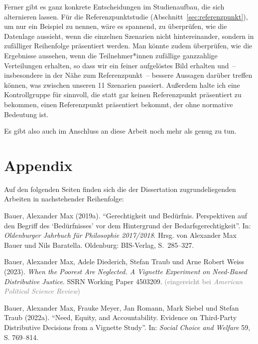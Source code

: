 \documentclass[justified,nobib,symmetric,twoside]{tufte-handout}
\begin{document}
Ferner gibt es ganz konkrete Entscheidungen im Studienaufbau, die sich alternieren lassen.
Für die Referenzpunktstudie (Abschnitt~\ref{sec:referenzpunkt}), um nur ein Beispiel zu nennen, wäre es spannend, zu überprüfen, wie die Datenlage aussieht, wenn die einzelnen Szenarien nicht hintereinander, sondern in zufälliger Reihenfolge präsentiert werden.
Man könnte zudem überprüfen, wie die Ergebnisse aussehen, wenn die Teilnehmer*innen zufällige ganzzahlige Verteilungen erhalten, so dass wir ein feiner aufgelöstes Bild erhalten und~-- insbesondere in der Nähe zum Referenzpunkt~-- bessere Aussagen darüber treffen können, was zwischen unseren 11 Szenarien passiert. Außerdem halte ich eine Kontrollgruppe für sinnvoll, die statt gar keinen Referenzpunkt präsentiert zu bekommen, einen Referenzpunkt präsentiert bekommt, der ohne normative Bedeutung ist.

Es gibt also auch im Anschluss an diese Arbeit noch mehr als genug zu tun.


\clearpage
\printbibliography[title={Bibliografie}]


\clearpage
\section*{Appendix}\label{sec:appendix}
Auf den folgenden Seiten finden sich die der Dissertation zugrundeliegenden Arbeiten in nachstehender Reihenfolge:

\vspace{1em}
\noindent\hangindent=0.4cm Bauer, Alexander Max (2019a). \enquote{Gerechtigkeit und Bedürfnis. Perspektiven auf den Begriff des \enquote{Bedürfnisses} vor dem Hintergrund der Bedarfsgerechtigkeit}. In: \textit{Oldenburger Jahrbuch für Philosophie 2017/2018}. Hrsg. von Alexander Max Bauer und Nils Baratella. Oldenburg: BIS-Verlag, S.~285--327.

\noindent\hangindent=0.4cm Bauer, Alexander Max, Adele Diederich, Stefan Traub und Arne Robert Weiss (2023). \textit{When the Poorest Are Neglected. A Vignette Experiment on Need-Based Distributive Justice}. SSRN Working Paper 4503209. \textcolor{gray}{(eingereicht bei \textit{American Political Science Review})}

\noindent\hangindent=0.4cm Bauer, Alexander Max, Frauke Meyer, Jan Romann, Mark Siebel und Stefan Traub (2022a). \enquote{Need, Equity, and Accountability. Evidence on Third-Party Distributive Decisions from a Vignette Study}. In: \textit{Social Choice and Welfare} 59, S. 769--814.
\end{document}
